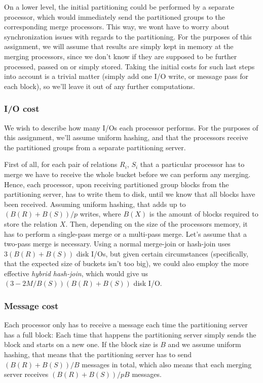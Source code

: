 \documentclass[a4paper, 12pt]{article}
\begin{document}
On a lower level, the initial partitioning could be performed by a
separate processor, which would immediately send the partitioned
groups to the corresponding merge processors. This way, we wont have
to worry about synchronization issues with regards to the
partitioning. For the purposes of this assignment, we will assume that
results are simply kept in memory at the merging processors, since we
don't know if they are supposed to be further processed, passed on or
simply stored. Taking the initial costs for such last steps into
account is a trivial matter (simply add one I/O write, or message pass
for each block), so we'll leave it out of any further computations.

\subsubsection*{I/O cost}

We wish to describe how many I/Os each processor performs. For the
purposes of this assignment, we'll assume uniform hashing, and that
the processors receive the partitioned groups from a separate
partitioning server.

First of all, for each pair of relations $R_i$, $S_i$ that a
particular processor has to merge we have to receive the whole bucket
before we can perform any merging. Hence, each processor, upon
receiving partitioned group blocks from the partitioning server, has
to write them to disk, until we know that all blocks have been
received. Assuming uniform hashing, that adds up to $(B(R) + B(S)) /
p$ writes, where $B(X)$ is the amount of blocks required to store the
relation $X$. Then, depending on the size of the processors memory, it
has to perform a single-pass merge or a multi-pass merge. Let's assume
that a two-pass merge is necessary. Using a normal merge-join or
hash-join uses $3(B(R) + B(S))$ disk I/Os, but given certain
circumstances (specifically, that the expected size of buckets isn't
too big), we could also employ the more effective \emph{hybrid
  hash-join}, which would give us $(3 - 2M/ B(S))(B(R) + B(S))$ disk
I/O.

\subsubsection*{Message cost}

Each processor only has to receive a message each time the
partitioning server has a full block: Each time that happens the
partitioning server simply sends the block and starts on a new one. If
the block size is $B$ and we assume uniform hashing, that means that
the partitioning server has to send $(B(R) + B(S)) / B$ messages in
total, which also means that each merging server receives $(B(R) +
B(S)) / pB$ messages.
\end{document}
